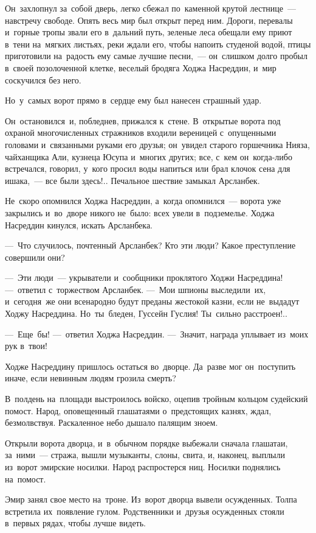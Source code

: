 \documentclass[12pt,a4paper]{book}
\begin{document}
Он~захлопнул за~собой дверь, легко сбежал по~каменной крутой лестнице~— навстречу свободе. Опять весь мир был открыт перед ним. Дороги, перевалы и~горные тропы звали его в~дальний путь, зеленые леса обещали ему приют в~тени на~мягких листьях, реки ждали его, чтобы напоить студеной водой, птицы приготовили на~радость ему самые лучшие песни,~— он~слишком долго пробыл в~своей позолоченной клетке, веселый бродяга Ходжа Насреддин, и~мир соскучился без него.

Но~у~самых ворот прямо в~сердце ему был нанесен страшный удар.

Он~остановился~и, побледнев, прижался к~стене. В~открытые ворота под охраной многочисленных стражников входили вереницей с~опущенными головами и~связанными руками его друзья; он~увидел старого горшечника Нияза, чайханщика Али, кузнеца Юсупа и~многих других; все, с~кем он~когда-либо встречался, говорил, у~кого просил воды напиться или брал клочок сена для ишака,~— все были здесь!.. Печальное шествие замыкал Арсланбек.

Не~скоро опомнился Ходжа Насреддин, а~когда опомнился~— ворота уже закрылись и~во~дворе никого не~было: всех увели в~подземелье. Ходжа Насреддин кинулся, искать Арсланбека.

—~Что случилось, почтенный Арсланбек? Кто эти люди? Какое преступление совершили они?

—~Эти люди~— укрыватели и~сообщники проклятого Ходжи Насреддина! —~ответил с~торжеством Арсланбек. —~Мои шпионы выследили~их, и~сегодня~же они всенародно будут преданы жестокой казни, если не~выдадут Ходжу Насреддина. Но~ты~бледен, Гуссейн Гуслия! Ты~сильно расстроен!..

—~Еще~бы! —~ответил Ходжа Насреддин. —~Значит, награда уплывает из~моих рук в~твои!

Ходже Насреддину пришлось остаться во~дворце. Да~разве мог он~поступить иначе, если невинным людям грозила смерть?

В~полдень на~площади выстроилось войско, оцепив тройным кольцом судейский помост. Народ, оповещенный глашатаями о~предстоящих казнях, ждал, безмолвствуя. Раскаленное небо дышало палящим зноем.

Открыли ворота дворца, и~в~обычном порядке выбежали сначала глашатаи, за~ними~— стража, вышли музыканты, слоны, свита, и, наконец, выплыли из~ворот эмирские носилки. Народ распростерся ниц. Носилки поднялись на~помост.

Эмир занял свое место на~троне. Из~ворот дворца вывели осужденных. Толпа встретила их~появление гулом. Родственники и~друзья осужденных стояли в~первых рядах, чтобы лучше видеть.
\end{document}
